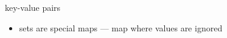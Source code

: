 \begin{frame}{key-value pairs}
    \begin{itemize}
    \item sets are special maps --- map where values are ignored
    \end{itemize}
\end{frame}

